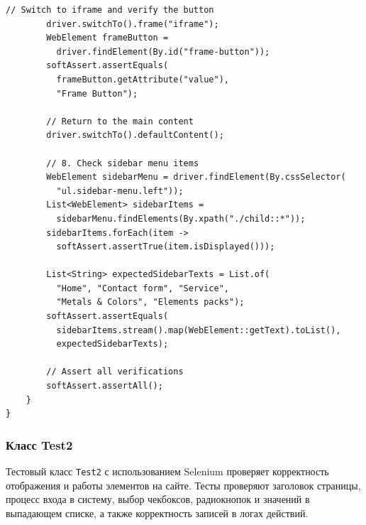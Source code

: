 \documentclass[areasetadvanced]{scrartcl}
\begin{document}
\begin{lstlisting}[caption={Test1}]
        // Switch to iframe and verify the button
        driver.switchTo().frame("iframe");
        WebElement frameButton =
          driver.findElement(By.id("frame-button"));
        softAssert.assertEquals(
          frameButton.getAttribute("value"),
          "Frame Button");

        // Return to the main content
        driver.switchTo().defaultContent();

        // 8. Check sidebar menu items
        WebElement sidebarMenu = driver.findElement(By.cssSelector(
          "ul.sidebar-menu.left"));
        List<WebElement> sidebarItems =
          sidebarMenu.findElements(By.xpath("./child::*"));
        sidebarItems.forEach(item ->
          softAssert.assertTrue(item.isDisplayed()));

        List<String> expectedSidebarTexts = List.of(
          "Home", "Contact form", "Service",
          "Metals & Colors", "Elements packs");
        softAssert.assertEquals(
          sidebarItems.stream().map(WebElement::getText).toList(),
          expectedSidebarTexts);

        // Assert all verifications
        softAssert.assertAll();
    }
}
\end{lstlisting}

\subsubsection{Класс Test2}

Тестовый класс \texttt{Test2} с использованием Selenium проверяет корректность отображения и работы элементов на сайте. Тесты проверяют заголовок страницы, процесс входа в систему, выбор чекбоксов, радиокнопок и значений в выпадающем списке, а также корректность записей в логах действий.
\end{document}
